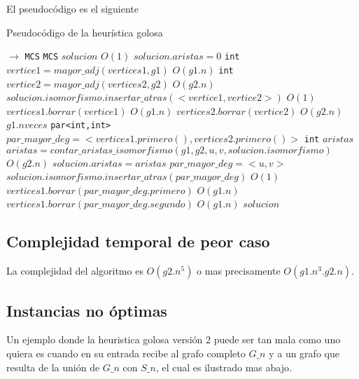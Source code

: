 El pseudocódigo es el siguiente

\begin{algorithm}[H]
  \begin{algorithmic}[1]
  \caption{Pseudocódigo de la heurística golosa}
  \label{algo:4-1}
     $\to$ \texttt{MCS}
      \State \texttt{MCS} $solucion$ 
        \Comment $O(1)$ 
      \State $solucion.aristas = 0$ 
      \State \texttt{int} $vertice1 = mayor\_adj(vertices1,g1)$ 
      \Comment $O(g1.n)$ 
      \State \texttt{int} $vertice2 = mayor\_adj(vertices2,g2)$ 
      \Comment $O(g2.n)$ 
      \State $solucion.isomorfismo.insertar\_atras(<vertice1,vertice2>)$
      \Comment $O(1)$
      \State $vertices1.borrar(vertice1)$ 
      \Comment $O(g1.n)$ 
      \State $vertices2.borrar(vertice2)$ 
      \Comment $O(g2.n)$
      \Comment $g1.n veces$
	  \State \texttt{par<int,int>}  $par\_mayor\_deg = <vertices1.primero(),vertices2.primero()>$
	  \State \texttt{int} $aristas$
	  \State $ aristas = contar\_aristas\_isomorfismo(g1,g2,u,v, solucion.isomorfismo)$
      \Comment $O(g2.n)$
      \State $solucion.aristas = aristas$
      \State $par\_mayor\_deg = <u,v>$
      \EndIf
	  \EndFor
	  \EndFor	 
	  \State  $solucion.isomorfismo.insertar\_atras(par\_mayor\_deg)$
      \Comment $O(1)$
	  \State $ vertices1.borrar(par\_mayor\_deg.primero)$
      \Comment $O(g1.n)$
	  \State $ vertices1.borrar(par\_mayor\_deg.segundo)$
      \Comment $O(g1.n)$
	  \EndWhile      
        \State \Return $solucion$
      \EndProcedure
	\end{algorithmic}
\end{algorithm}


\subsection{Complejidad temporal de peor caso}

La complejidad del algoritmo es $O(g2.n^5)$ o mas precisamente $O(g1.n^{3}.g2.n)$.

\subsection{Instancias no óptimas}

Un ejemplo donde la heuristica golosa versión 2 puede ser tan mala como uno quiera es cuando en su entrada recibe al grafo completo $G\_n$ y a un grafo que resulta de la unión de $G\_n$ con $S\_n$, el cual es ilustrado mas abajo. 


